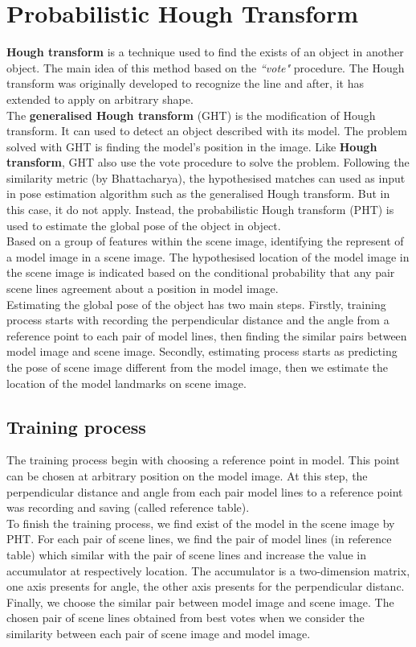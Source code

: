 \section{Probabilistic Hough Transform}
\textbf{Hough transform} is a technique used to find the exists of an object in another object. The main idea of this method based on the \textit{``vote"} procedure. The Hough transform was originally developed to recognize the line\cite{hough1962method} and after, it has extended to apply on arbitrary shape\cite{duda1972use}.\\[0.2cm]
The \textbf{generalised Hough transform}\cite{ballard1981generalizing} (GHT) is the modification of Hough transform. It can used to detect an object described with its model. The problem solved with GHT is finding the model's position in the image. Like \textbf{Hough transform}, GHT also use the vote procedure to solve the problem. Following the similarity metric (by Bhattacharya), the hypothesised matches can used as input in pose estimation algorithm such as the generalised Hough transform. But in this case, it do not apply. Instead, the probabilistic Hough transform (PHT) is used to estimate the global pose of the object\cite{ashbrook1995robust} in object.\\[0.3cm]
Based on a group of features within the scene image, identifying the represent of a model image in a scene image. The hypothesised location of the model image in the scene image is indicated based on the conditional probability that any pair scene lines agreement about a position in model image.\\[0.3cm]
Estimating the global pose of the object has two main steps. Firstly, training process starts with recording the perpendicular distance and the angle from a reference point to each pair of model lines, then finding the similar pairs between model image and scene image. Secondly, estimating process starts as predicting the pose of scene image different from the model image, then we estimate the location of the model landmarks on scene image.
\subsection{Training process}
The training process begin with choosing a reference point in model. This point can be chosen at arbitrary position on the model image. At this step, the perpendicular distance and angle from each pair model lines to a reference point was recording and saving (called reference table). \\
To finish the training process, we find exist of the model in the scene image by PHT. For each pair of scene lines, we find the pair of model lines (in reference table) which similar with the pair of scene lines and increase the value in accumulator at respectively location. The accumulator is a two-dimension matrix, one axis presents for angle, the other axis presents for the perpendicular distanc. Finally, we choose the similar pair between model image and scene image. The chosen pair of scene lines obtained from best votes when we consider the similarity between each pair of scene image and model image.
